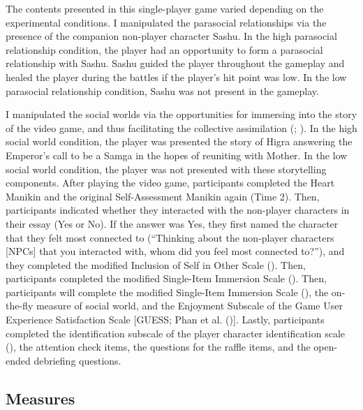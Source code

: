 \documentclass[
]{udthesis}
\begin{document}
The contents presented in this single-player game varied depending on
the experimental conditions. I manipulated the parasocial relationships
via the presence of the companion non-player character Sashu. In the
high parasocial relationship condition, the player had an opportunity to
form a parasocial relationship with Sashu. Sashu guided the player
throughout the gameplay and healed the player during the battles if the
player's hit point was low. In the low parasocial relationship
condition, Sashu was not present in the gameplay.

I manipulated the social worlds via the opportunities for immersing into
the story of the video game, and thus facilitating the collective
assimilation (; ). In the high social world
condition, the player was presented the story of Higra answering the
Emperor's call to be a Samga in the hopes of reuniting with Mother. In
the low social world condition, the player was not presented with these
storytelling components. After playing the video game, participants
completed the Heart Manikin and the original Self-Assessment Manikin
again (Time 2). Then, participants indicated whether they interacted
with the non-player characters in their essay (Yes or No). If the answer
was Yes, they first named the character that they felt most connected to
(``Thinking about the non-player characters {[}NPCs{]} that you interacted
with, whom did you feel most connected to?''), and they completed the
modified Inclusion of Self in Other Scale ().
Then, participants completed the modified Single-Item Immersion Scale
(). Then, participants will
complete the modified Single-Item Immersion Scale
(), the on-the-fly measure of
social world, and the Enjoyment Subscale of the Game User Experience
Satisfaction Scale {[}GUESS; Phan et al. (){]}. Lastly,
participants completed the identification subscale of the player
character identification scale (),
the attention check items, the questions for the raffle items, and the
open-ended debriefing questions.

\subsection{Measures}\label{measures-1}
\end{document}
